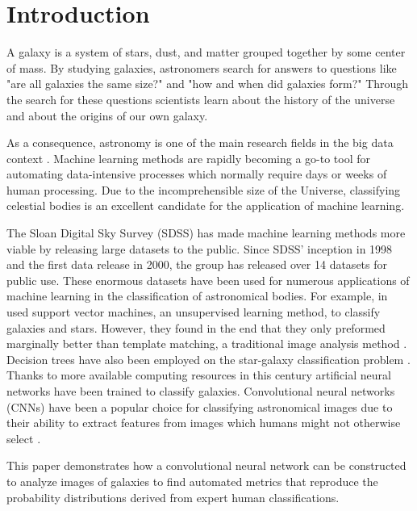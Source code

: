 \section{Introduction}

A galaxy is a system of stars, dust, and matter grouped together by some center of mass. By studying galaxies, astronomers search for answers to questions like "are all galaxies the same size?" and "how and when did galaxies form?" Through the search for these questions scientists learn about the history of the universe and about the origins of our own galaxy.


As a consequence, astronomy is one of the main research fields in the big data context \cite{microsoft-galaxies}. Machine learning methods are rapidly becoming a go-to tool for automating data-intensive processes which normally require days or weeks of human processing. Due to the incomprehensible size of the Universe, classifying celestial bodies is an excellent candidate for the application of machine learning.

The Sloan Digital Sky Survey (SDSS) has made machine learning methods more viable by releasing large datasets to the public. Since SDSS' inception in 1998 and the first data release in 2000, the group has released over 14 datasets for public use. These enormous datasets have been used for numerous applications of machine learning in the classification of astronomical bodies. For example, \citeauthor{svn-galaxy} in \citeyear{svn-galaxy} used support vector machines, an unsupervised learning method, to classify galaxies and stars. However, they found in the end that they only preformed marginally better than template matching, a traditional image analysis method \cite{svn-galaxy}. Decision trees have also been employed on the star-galaxy classification problem \cite{ball-decision-trees}. Thanks to more available computing resources in this century artificial neural networks have been trained to classify galaxies. Convolutional neural networks (CNNs) have been a popular choice for classifying astronomical images due to their ability to extract features from images which humans might not otherwise select \cite{cnn-star-galaxy}.

This paper demonstrates how a convolutional neural network can be constructed to analyze images of galaxies to find automated metrics that reproduce the probability distributions derived from expert human classifications.

